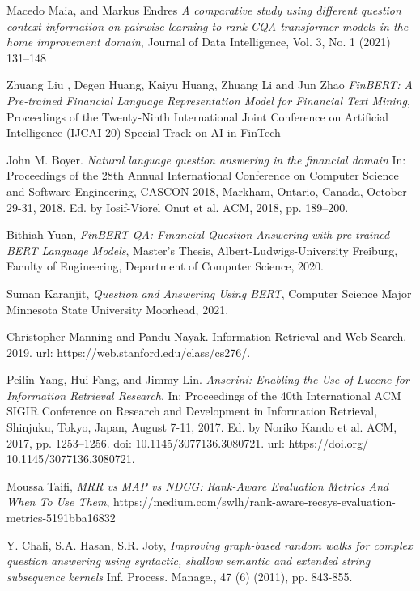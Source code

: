 \documentclass[11pt,a4paper]{article}
\begin{document}
\begin{thebibliography}{}

 Macedo Maia, and Markus Endres \emph{A comparative study using different question context information on pairwise learning-to-rank CQA transformer models in the home improvement domain}, Journal of Data Intelligence, Vol. 3, No. 1 (2021) 131–148

 Zhuang Liu , Degen Huang, Kaiyu Huang, Zhuang Li and Jun Zhao \emph{FinBERT: A Pre-trained Financial Language Representation Model for Financial Text Mining}, Proceedings of the Twenty-Ninth International Joint Conference on Artificial Intelligence (IJCAI-20) Special Track on AI in FinTech

 John M. Boyer. \emph{Natural language question answering in the financial domain} In: Proceedings of the 28th Annual International Conference on Computer Science and Software Engineering, CASCON 2018, Markham, Ontario, Canada, October 29-31, 2018. Ed. by Iosif-Viorel Onut et al. ACM, 2018, pp. 189–200.

 Bithiah Yuan, \emph{FinBERT-QA: Financial Question Answering with pre-trained BERT Language Models}, Master’s Thesis, Albert-Ludwigs-University Freiburg, Faculty of Engineering, Department of Computer Science, 2020.

 Suman Karanjit, \emph{Question and Answering Using BERT}, Computer Science Major Minnesota State University Moorhead, 2021.

 Christopher Manning and Pandu Nayak. Information Retrieval and Web Search. 2019. url: https://web.stanford.edu/class/cs276/.

 Peilin Yang, Hui Fang, and Jimmy Lin. \emph{Anserini: Enabling the Use of Lucene for Information Retrieval Research}. In: Proceedings of the 40th International ACM SIGIR Conference on Research and Development in Information Retrieval, Shinjuku, Tokyo, Japan, August 7-11, 2017. Ed. by Noriko Kando et al. ACM, 2017, pp. 1253–1256. doi: 10.1145/3077136.3080721. url: https://doi.org/ 10.1145/3077136.3080721.

 Moussa Taifi, \emph{MRR vs MAP vs NDCG: Rank-Aware Evaluation Metrics And When To Use Them}, https://medium.com/swlh/rank-aware-recsys-evaluation-metrics-5191bba16832

 Y. Chali, S.A. Hasan, S.R. Joty, \emph{Improving graph-based random walks for complex question answering using syntactic, shallow semantic and extended string subsequence kernels} Inf. Process. Manage., 47 (6) (2011), pp. 843-855.


\end{thebibliography}
\end{document}
